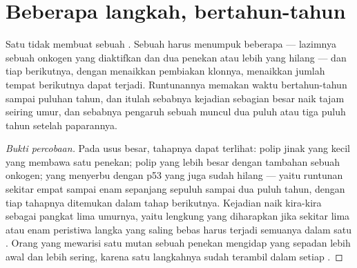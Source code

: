 \section{Beberapa langkah, bertahun-tahun}

\begin{proposition}\label{prop:g11:cancer:multistep}
Satu  tidak membuat sebuah . Sebuah  harus menumpuk
beberapa  --- lazimnya sebuah onkogen yang diaktifkan dan dua
penekan atau lebih yang hilang --- dan tiap  berikutnya, dengan
menaikkan pembiakan klonnya, menaikkan jumlah  tempat 
berikutnya dapat terjadi. Runtunannya memakan waktu bertahun-tahun
sampai puluhan tahun, dan itulah sebabnya kejadian sebagian besar
 naik tajam seiring umur, dan sebabnya pengaruh sebuah 
muncul dua puluh atau tiga puluh tahun setelah paparannya.
\end{proposition}
\begin{proof}[Bukti percobaan]
Pada usus besar, tahapnya dapat terlihat: polip jinak yang kecil yang
membawa satu  penekan; polip yang lebih besar dengan tambahan
sebuah onkogen;  yang menyerbu dengan p53 yang juga sudah hilang
--- yaitu runtunan sekitar empat sampai enam  sepanjang sepuluh
sampai dua puluh tahun, dengan tiap tahapnya ditemukan dalam  tahap
berikutnya. Kejadian  naik kira-kira sebagai pangkat lima
umurnya, yaitu lengkung yang diharapkan jika sekitar lima atau enam
peristiwa langka yang saling bebas harus terjadi semuanya dalam satu
. Orang yang mewarisi satu  mutan sebuah  penekan mengidap
 yang sepadan lebih awal dan lebih sering, karena satu langkahnya
sudah terambil dalam setiap .
\end{proof}

